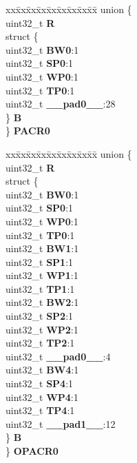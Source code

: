 \begin{DoxyCompactItemize}
\begin{tabbing}
\end{tabbing}\item 
\mbox{\label{structPBRIDGE__A__tag_ad18d7667cb861ceef83959da0a38ec66}} 
\begin{tabbing}
xx\=xx\=xx\=xx\=xx\=xx\=xx\=xx\=xx\=\kill
union \{\\
\>uint32\_t {\bfseries R}\\
\>struct \{\\
\>\>uint32\_t {\bfseries BW0}:1\\
\>\>uint32\_t {\bfseries SP0}:1\\
\>\>uint32\_t {\bfseries WP0}:1\\
\>\>uint32\_t {\bfseries TP0}:1\\
\>\>uint32\_t {\bfseries \_\_pad0\_\_}:28\\
\>\} {\bfseries B}\\
\} {\bfseries PACR0}\\

\end{tabbing}\item 
\mbox{\label{structPBRIDGE__A__tag_a6ffdd098e82c79eb883639319a13b372}} 
\begin{tabbing}
xx\=xx\=xx\=xx\=xx\=xx\=xx\=xx\=xx\=\kill
union \{\\
\>uint32\_t {\bfseries R}\\
\>struct \{\\
\>\>uint32\_t {\bfseries BW0}:1\\
\>\>uint32\_t {\bfseries SP0}:1\\
\>\>uint32\_t {\bfseries WP0}:1\\
\>\>uint32\_t {\bfseries TP0}:1\\
\>\>uint32\_t {\bfseries BW1}:1\\
\>\>uint32\_t {\bfseries SP1}:1\\
\>\>uint32\_t {\bfseries WP1}:1\\
\>\>uint32\_t {\bfseries TP1}:1\\
\>\>uint32\_t {\bfseries BW2}:1\\
\>\>uint32\_t {\bfseries SP2}:1\\
\>\>uint32\_t {\bfseries WP2}:1\\
\>\>uint32\_t {\bfseries TP2}:1\\
\>\>uint32\_t {\bfseries \_\_pad0\_\_}:4\\
\>\>uint32\_t {\bfseries BW4}:1\\
\>\>uint32\_t {\bfseries SP4}:1\\
\>\>uint32\_t {\bfseries WP4}:1\\
\>\>uint32\_t {\bfseries TP4}:1\\
\>\>uint32\_t {\bfseries \_\_pad1\_\_}:12\\
\>\} {\bfseries B}\\
\} {\bfseries OPACR0}\\


\end{tabbing}
\end{DoxyCompactItemize}
